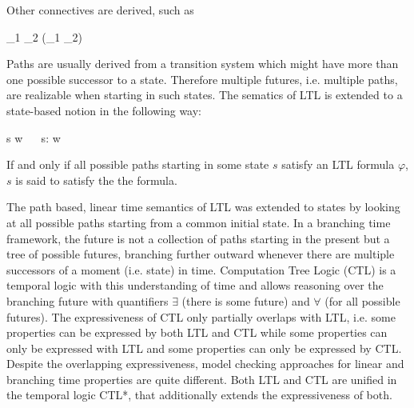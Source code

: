     Other connectives are derived, such as

    \startformula
        \startalign[n=3,align={right,left,middle}]
            \NC \varphi_1 \vee \varphi_2 \NC \colonequals \neg(\neg \varphi_1 \wedge \neg \varphi_2) ~~~\NC {} \NR
            \NC \Finally \varphi \NC \colonequals \True \Until \varphi \NC {} \NR
            \NC \Globally \varphi \NC \colonequals \neg \Finally \neg \varphi \NC {} \NR
        \stopalign
    \stopformula

    Paths are usually derived from a transition system which might have more than one possible successor to a state.
    Therefore multiple futures, i.e. multiple paths, are realizable when starting in such states.
    The sematics of LTL is extended to a state-based notion in the following way:

    \startformula
        s \vDash \phi \iff \forall w ~~ s: w \vDash \phi \EndPeriod
    \stopformula

    If and only if all possible paths starting in some state $s$ satisfy an LTL formula $\varphi$, $s$ is said to satisfy the the formula.

\stopsubsection


\startsubsection[title={Other Temporal Logics},reference=sec:theory-logic-other]

    The path based, linear time semantics of LTL was extended to states by looking at all possible paths starting from a common initial state.
    In a branching time framework, the future is not a collection of paths starting in the present but a tree of possible futures, branching further outward whenever there are multiple successors of a moment (i.e. state) in time.
    Computation Tree Logic (CTL) is a temporal logic with this understanding of time and allows reasoning over the branching future with quantifiers $\exists$ (there is some future) and $\forall$ (for all possible futures).
    The expressiveness of CTL only partially overlaps with LTL, i.e. some properties can be expressed by both LTL and CTL while some properties can only be expressed with LTL and some properties can only be expressed by CTL. %
    Despite the overlapping expressiveness, model checking approaches for linear and branching time properties are quite different. %
    Both LTL and CTL are unified in the temporal logic CTL*, that additionally extends the expressiveness of both.


